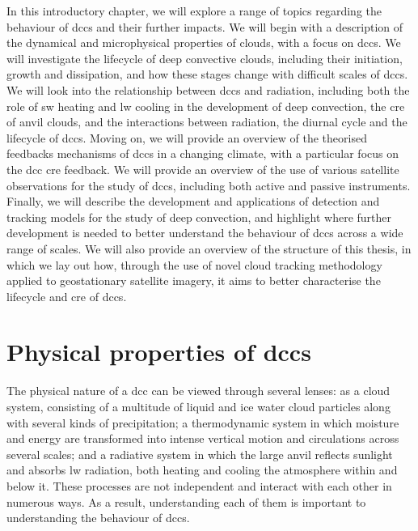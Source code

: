 In this introductory chapter, we will explore a range of topics regarding the behaviour of \acrshort{dcc}s and their further impacts.
We will begin with a description of the dynamical and microphysical properties of clouds, with a focus on \acrshort{dcc}s.
We will investigate the lifecycle of deep convective clouds, including their initiation, growth and dissipation, and how these stages change with difficult scales of \acrshort{dcc}s.
We will look into the relationship between \acrshort{dcc}s and radiation, including both the role of \acrfull{sw} heating and \acrfull{lw} cooling in the development of deep convection, the \acrfull{cre} of anvil clouds, and the interactions between radiation, the diurnal cycle and the lifecycle of \acrshort{dcc}s.
Moving on, we will provide an overview of the theorised feedbacks mechanisms of \acrshort{dcc}s in a changing climate, with a particular focus on the \acrshort{dcc} \acrshort{cre} feedback.
We will provide an overview of the use of various satellite observations for the study of \acrshort{dcc}s, including both active and passive instruments.
Finally, we will describe the development and applications of detection and tracking models for the study of deep convection, and highlight where further development is needed to better understand the behaviour of \acrshort{dcc}s across a wide range of scales.
We will also provide an overview of the structure of this thesis, in which we lay out how, through the use of novel cloud tracking methodology applied to geostationary satellite imagery, it aims to better characterise the lifecycle and \acrshort{cre} of \acrshort{dcc}s.


\section{Physical properties of \acrshort{dcc}s}

The physical nature of a \acrshort{dcc} can be viewed through several lenses: as a cloud system, consisting of a multitude of liquid and ice water cloud particles along with several kinds of precipitation; a thermodynamic system in which moisture and energy are transformed into intense vertical motion and circulations across several scales; and a radiative system in which the large anvil reflects sunlight and absorbs \acrshort{lw} radiation, both heating and cooling the atmosphere within and below it.
These processes are not independent and interact with each other in numerous ways.
As a result, understanding each of them is important to understanding the behaviour of \acrshort{dcc}s.

